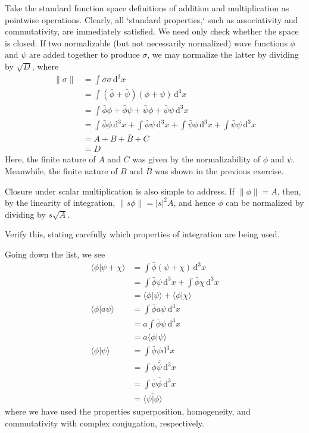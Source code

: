 \documentclass[../road-to-reality.tex]{subfiles}
\begin{document}
\begin{questions}
\begin{solution}
	Take the standard function space definitions of addition and multiplication as pointwise operations. Clearly, all `standard properties,` such as associativity and commutativity, are immediately satisfied. We need only check whether the space is closed. If two normalizable (but not necessarily normalized) wave functions $\phi$ and $\psi$ are added together to produce $\sigma$, we may normalize the latter by dividing by $\sqrt{D}$, where
	\begin{align*}
		\|\sigma\| &= \int \bar{\sigma}\sigma \, \mathrm{d}^3x \\
		&= \int (\bar{\phi} + \bar{\psi})(\phi + \psi) \, \mathrm{d}^3x \\
		&= \int \bar{\phi}\phi + \bar{\phi}\psi + \bar{\psi}\phi + \bar{\psi}\psi \, \mathrm{d}^3x \\
		&= \int\bar{\phi}\phi\,\mathrm{d}^3x + \int\bar{\phi}\psi\,\mathrm{d}^3x + \int\bar{\psi}\phi\,\mathrm{d}^3x + \int\bar{\psi}\psi\,\mathrm{d}^3x \\
		&= A + B + \bar{B} + C \\
		&= D
	\end{align*}
	Here, the finite nature of $A$ and $C$ was given by the normalizability of $\phi$ and $\psi$. Meanwhile, the finite nature of $B$ and $\bar{B}$ was shown in the previous exercise.
	
	Closure under scalar multiplication is also simple to address. If $\|\phi\| = A$, then, by the linearity of integration, $\|s\phi\| = |s|^2A$, and hence $\phi$ can be normalized by dividing by $s\sqrt{A}$.
\end{solution}

\question Verify this, stating carefully which properties of integration are being used.

\begin{solution}
	Going down the list, we see
	\begin{align*}
		\langle\phi|\psi + \chi\rangle &= \int\bar{\phi}(\psi + \chi)\,\mathrm{d}^3x \\
		&= \int\bar{\phi}\psi\,\mathrm{d}^3x + \int\bar{\phi}\chi\,\mathrm{d}^3x \\
		&= \langle\phi|\psi\rangle + \langle\phi|\chi\rangle \\
		\langle\phi|a\psi\rangle &= \int\bar{\phi}a\psi\,\mathrm{d}^3x \\
		&= a\int\bar{\phi}\psi\,\mathrm{d}^3x \\
		&= a\langle\phi|\psi\rangle \\
		\langle\phi|\psi\rangle &= \int\bar{\phi}\psi\mathrm{d}^3x \\
		&= \overline{\int{\phi\bar{\psi}}\,\mathrm{d}^3x} \\
		&= \overline{\int{\bar{\psi}\phi}\,\mathrm{d}^3x} \\ 
		&= \overline{\langle\psi|\phi\rangle}
	\end{align*}
	where we have used the properties superposition, homogeneity, and commutativity with complex conjugation, respectively.
	

\end{solution}
\end{questions}
\end{document}
